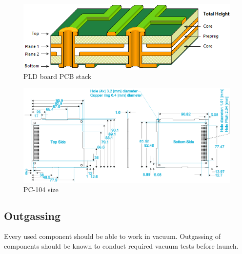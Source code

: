         \begin{figure}[H]
            \centering
            \includegraphics[width=0.5\paperwidth]{img/PLD_PCB_stack.png}
            \caption{PLD board PCB stack}
            \label{PLD_PCB_stack}
        \end{figure}

        \begin{figure}[H]
            \centering
            \includegraphics[width=0.7\paperwidth]{img/PC104_PLD_size.png}
            \caption{PC-104 size}
            \label{PLD_PCB_size}
        \end{figure}



    \subsection{Outgassing}
        Every used component should be able to work in vacuum. Outgassing of components should be known to conduct required vacuum tests before launch.

